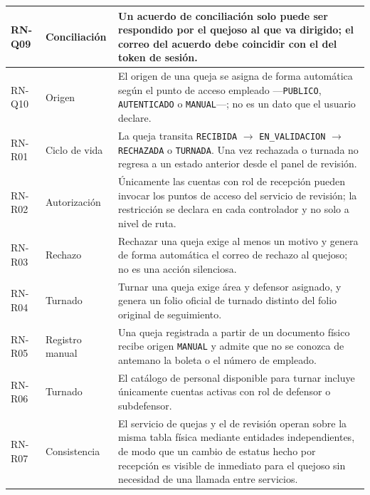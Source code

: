 \begin{longtable}{|p{1.7cm}|p{2.7cm}|p{9.7cm}|}
		RN-Q09 & Conciliación & Un acuerdo de conciliación solo puede ser respondido por el quejoso
		al que va dirigido; el correo del acuerdo debe coincidir con el del token de sesión.
		\\ \hline
	
		RN-Q10 & Origen & El origen de una queja se asigna de forma automática según el punto de
		acceso empleado ---\texttt{PUBLICO}, \texttt{AUTENTICADO} o \texttt{MANUAL}---; no es un dato
		que el usuario declare. \\ \hline
	
		RN-R01 & Ciclo de vida & La queja transita \texttt{RECIBIDA} $\rightarrow$
		\texttt{EN\_VALIDACION} $\rightarrow$ \texttt{RECHAZADA} o \texttt{TURNADA}. Una vez
		rechazada o turnada no regresa a un estado anterior desde el panel de revisión. \\ \hline
	
		RN-R02 & Autorización & Únicamente las cuentas con rol de recepción pueden invocar los
		puntos de acceso del servicio de revisión; la restricción se declara en cada controlador y no
		solo a nivel de ruta. \\ \hline
	
		RN-R03 & Rechazo & Rechazar una queja exige al menos un motivo y genera de forma automática
		el correo de rechazo al quejoso; no es una acción silenciosa. \\ \hline
	
		RN-R04 & Turnado & Turnar una queja exige área y defensor asignado, y genera un folio oficial
		de turnado distinto del folio original de seguimiento. \\ \hline
	
		RN-R05 & Registro manual & Una queja registrada a partir de un documento físico recibe origen
		\texttt{MANUAL} y admite que no se conozca de antemano la boleta o el número de empleado.
		\\ \hline
	
		RN-R06 & Turnado & El catálogo de personal disponible para turnar incluye únicamente cuentas
		activas con rol de defensor o subdefensor. \\ \hline
	
		RN-R07 & Consistencia & El servicio de quejas y el de revisión operan sobre la misma tabla
		física mediante entidades independientes, de modo que un cambio de estatus hecho por
		recepción es visible de inmediato para el quejoso sin necesidad de una llamada entre
		servicios. \\ \hline
	

\end{longtable}
